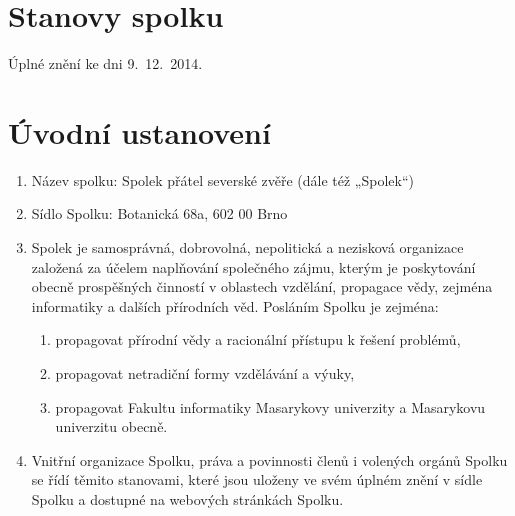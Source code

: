 \documentclass[11pt,a4paper]{article}
\begin{document}
\section*{\Huge{}Stanovy spolku}

Úplné znění ke dni 9.\ 12.\ 2014.

\section{Úvodní ustanovení}
\begin{enumerate}[itemsep=0pt]
    \item Název spolku: Spolek přátel severské zvěře (dále též „Spolek“)
    \item Sídlo Spolku: Botanická 68a, 602 00 Brno
    \item Spolek je samosprávná, dobrovolná, nepolitická a nezisková organizace 
    založená za účelem naplňování společného zájmu, kterým je poskytování obecně
    prospěšných činností v oblastech vzdělání, propagace vědy, zejména 
    informatiky a dalších přírodních věd. Posláním Spolku je zejména: 
    \begin{enumerate}[itemsep=0pt,topsep=0pt]
        \item propagovat přírodní vědy a racionální přístupu k řešení problémů,
        \item propagovat netradiční formy vzdělávání a výuky,
        \item propagovat Fakultu informatiky Masarykovy univerzity a Masarykovu univerzitu obecně.
    \end{enumerate}
    \item Vnitřní organizace Spolku, práva a povinnosti členů i volených orgánů 
    Spolku se řídí těmito stanovami, které jsou uloženy ve svém úplném znění 
    v sídle Spolku a dostupné na webových stránkách Spolku.
\end{enumerate}
\end{document}
